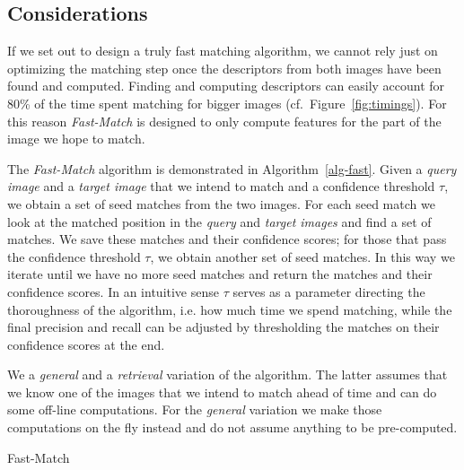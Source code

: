 \documentclass[10pt,twocolumn,letterpaper]{article}
\begin{document}
\subsection{Considerations}
\label{considerations}
%
If we set out to design a truly fast matching algorithm, we cannot rely just on optimizing the matching step once the descriptors from both images have been found and computed. Finding and computing descriptors can easily account for 80\% of the time spent matching for bigger images (cf.\ Figure~\ref{fig:timings}). For this reason \emph{Fast-Match} is designed to only compute features for the part of the image we hope to match. 

The \emph{Fast-Match} algorithm is demonstrated in Algorithm~\ref{alg-fast}. Given a \emph{query image} and a \emph{target image} that we intend to match and a confidence threshold $\tau$, we obtain a set of seed matches from the two images. For each seed match we look at the matched position in the \emph{query} and \emph{target images} and find a set of matches. We save these matches and their confidence scores; for those that pass the confidence threshold $\tau$, we obtain another set of seed matches. In this way we iterate until we have no more seed matches and return the matches and their confidence scores. In an intuitive sense $\tau$ serves as a parameter directing the thoroughness of the algorithm, i.e. how much time we spend matching, while the final precision and recall can be adjusted by thresholding the matches on their confidence scores at the end.

We a \emph{general} and a \emph{retrieval} variation of the algorithm. The latter assumes that we know one of the images that we intend to match ahead of time and can do some off-line computations. For the \emph{general} variation we make those computations on the fly instead and do not assume anything to be pre-computed. 

\begin{algorithm}[htb]
\caption{Fast-Match}
\label{alg-fast}
\end{algorithm}
\end{document}

